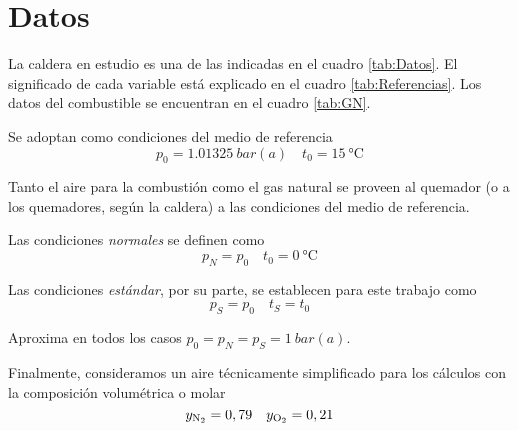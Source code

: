 \newpage
\section{Datos}\label{sec:Datos}
La caldera en estudio es una de las indicadas en el cuadro \ref{tab:Datos}. El significado de cada variable está explicado en el cuadro \ref{tab:Referencias}. Los datos del combustible se encuentran en el cuadro \ref{tab:GN}.

Se adoptan como condiciones del medio de referencia
\begin{equation}
    p_0=\SI{1.01325}{bar(a)}\quad t_0=\SI{15}{\celsius}
\end{equation}

Tanto el aire para la combustión como el gas natural se proveen al quemador (o a los quemadores, según la caldera) a las condiciones del medio de referencia.

Las condiciones \textit{normales} se definen como
\begin{equation}
    p_N=p_0\quad t_0=\SI{0}{\celsius}
\end{equation}

Las condiciones \textit{estándar}, por su parte, se establecen para este trabajo como
\begin{equation}
    p_S=p_0\quad t_S=t_0
\end{equation}

Aproxima en todos los casos $p_0=p_N=p_S=\SI{1}{bar(a)}$.

Finalmente, consideramos un aire técnicamente simplificado para los cálculos con la composición volumétrica o molar
\begin{equation}
    y_{\ce{ N2 }}=0,79\quad y_{\ce{ O2 }}=0,21
\end{equation}

